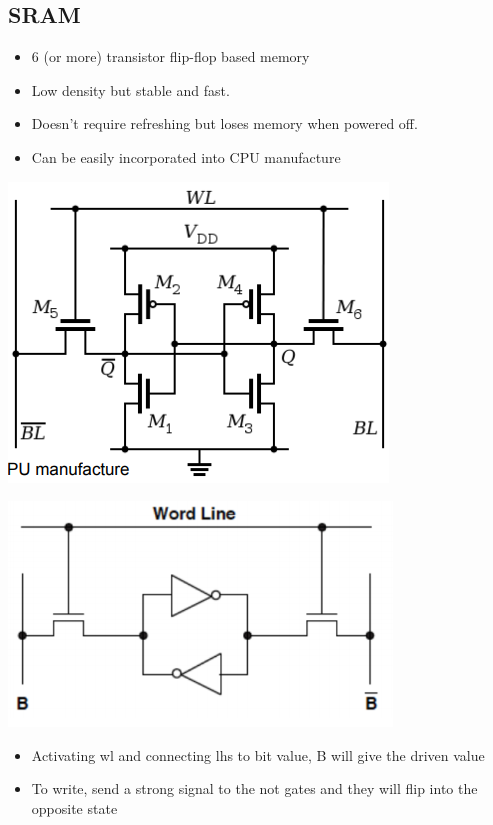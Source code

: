 \documentclass{article}[18pt]
\begin{document}
\subsection{SRAM}
\begin{itemize}
	\item 6 (or more) transistor flip-flop based memory
	\item Low density but stable and fast. 
	\item Doesn’t require refreshing but loses memory when powered off. 
	\item Can be easily incorporated into CPU manufacture
\end{itemize}
\begin{center}
	\includegraphics[scale=0.7]{SRAM}
\end{center}
\begin{center}
	\includegraphics[scale=0.7]{SRAM1}
\end{center}
\begin{itemize}
	\item Activating wl and connecting lhs to bit value, B will give the driven value
	\item To write, send a strong signal to the not gates and they will flip into the opposite state
\end{itemize}
\end{document}
